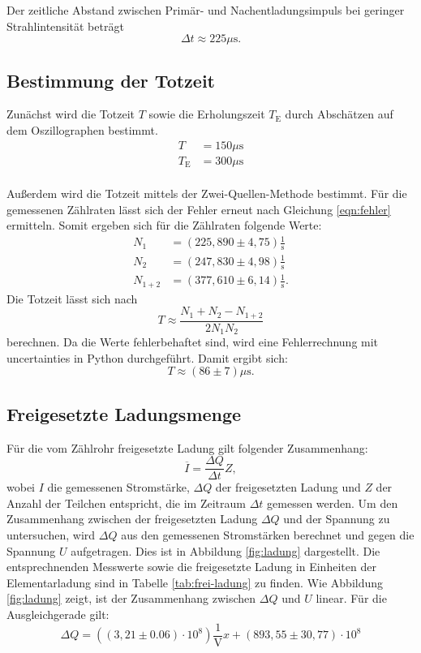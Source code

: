 Der zeitliche Abstand zwischen Primär- und Nachentladungsimpuls bei geringer Strahlintensität beträgt
\begin{equation}
  \Delta t \approx 225\mu\si{\second}.
\end{equation}

\subsection{Bestimmung der Totzeit}
Zunächst wird die Totzeit $T$ sowie die Erholungszeit $T_\mathrm{E}$ durch Abschätzen auf dem Oszillographen bestimmt.
\begin{align}
  T &= 150 \mu \si{\second}\\
  T_\mathrm{E} &= 300 \mu\si{\second}\\
\end{align}

Außerdem wird die Totzeit mittels der Zwei-Quellen-Methode bestimmt. Für die gemessenen Zählraten lässt sich der Fehler erneut nach Gleichung \ref{eqn:fehler} ermitteln. Somit ergeben sich für die Zählraten folgende Werte:
\begin{align}
  N_1&=(225,890 \pm 4,75) \frac{1}{\si{\second}} \\
  N_2 &= (247,830 \pm 4,98) \frac{1}{\si{\second}} \\
  N_{1+2} &= (377,610 \pm 6,14) \frac{1}{\si{\second}}.
\end{align}
Die Totzeit lässt sich nach
\begin{equation}
  T \approx \frac{N_1+N_2-N_{1+2}}{2N_1N_2}
\end{equation}
berechnen. Da die Werte fehlerbehaftet sind, wird eine Fehlerrechnung mit uncertainties in Python durchgeführt.  Damit ergibt sich:
\begin{equation}
  T\approx (86 \pm 7)\mu\si{\second}.
\end{equation}

\subsection{Freigesetzte Ladungsmenge}
Für die vom Zählrohr freigesetzte Ladung gilt folgender Zusammenhang:
\begin{equation}
  \overline{I} = \frac{\Delta Q}{\Delta t} Z,
\end{equation}
wobei $I$ die gemessenen Stromstärke, $\Delta Q$ der freigesetzten Ladung und $Z$ der Anzahl der Teilchen entspricht, die im Zeitraum $\Delta t$ gemessen werden.
Um den Zusammenhang zwischen der freigesetzten Ladung $\Delta Q$ und der Spannung zu untersuchen, wird $\Delta Q$ aus den gemessenen Stromstärken berechnet und gegen die Spannung $U$ aufgetragen. Dies ist in Abbildung \ref{fig:ladung} dargestellt. Die entsprechnenden Messwerte sowie die freigesetzte Ladung in Einheiten der Elementarladung sind in Tabelle \ref{tab:frei-ladung} zu finden.
Wie Abbildung \ref{fig:ladung} zeigt, ist der Zusammenhang zwischen $\Delta Q$ und $U$ linear. Für die Ausgleichgerade gilt:
\begin{equation}
  \Delta Q = ((3,21 \pm 0.06)\cdot 10^8)\frac{1}{\si{\volt}}x + (893,55 \pm 30,77)\cdot 10^8
\end{equation}

